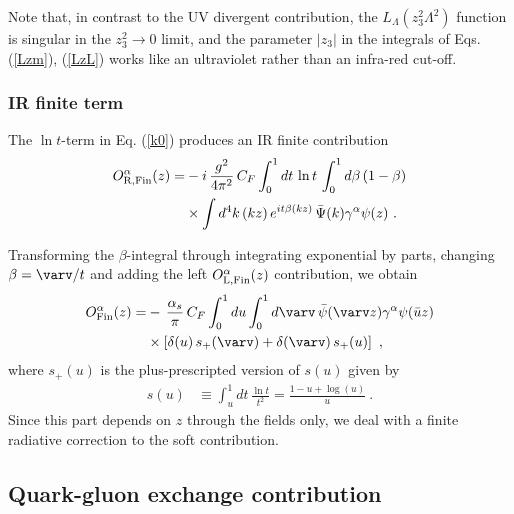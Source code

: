 \documentclass[final,5p,times,twocolumn]{elsarticle}
\begin{document}
Note  that, in contrast to  the UV divergent contribution,
the  $L_ \Lambda(z_3^2  \Lambda^2)$ function is singular in the $z_3^2\to 0$ limit, and 
the parameter 
 $|z_3|$  in the integrals  of Eqs. (\ref{Lzm}), (\ref{LzL})  works like an  ultraviolet 
 rather than an  infra-red cut-off. 
 


 \subsubsection{IR finite  term}


The  $\ln t$-term in Eq. (\ref{k0})  produces an IR finite contribution 
     \begin{align} 
  O^\alpha_{\rm R, Fin}  (z)  =&-  i    \,      \frac{ g^2}{4 \pi^2} \, C_F  \int_0^1 dt \, \ln  t \, 
    \int_0^1 d \beta \, (1-\beta)       \nonumber \\ &  \times    \int d^4 k \,    (kz)\, 
     e^{i  t \beta  (k z)} 
     \,    \bar \Psi (k)    \gamma^\alpha \psi (z)
   \ .
    \label{Lnt}
 \end{align} 
 




 

Transforming the $\beta$-integral through integrating exponential   by parts,  
changing  $\beta=\varv/t$  and adding the  left $O^\alpha_{\rm L, Fin}  (z)$ contribution, we obtain 
   \begin{align} 
  O^\alpha_{\rm  Fin}  (z)  =&-     \,      \frac{ \alpha_s }{ \pi} \, C_F  \int_0^1 du \int_0^1 d\varv \, 
\bar \psi (\varv z)    \gamma^\alpha \psi (\bar u z) 
       \nonumber \\ &  \times 
   \left [  \delta (u) \,  s_+(\varv)+ \delta (\varv) \,  s_+(u) \right ]
   \ , 
    \label{Ftot}
 \end{align} 
 where $s_+(u)$ is the plus-prescripted version of $s(u)$ given by 
    \begin{align} 
s(u) & \equiv 
  \int_u^1 dt \,\frac{ \ln t}{t^2}  = \frac{1-u+\log (u)}{u}  \   . 
    \label{Sv}
 \end{align}
Since this part   depends on $z$   through the  fields only,  we deal  with  a finite radiative correction
to the soft contribution. 

\subsection{Quark-gluon exchange contribution}
\end{document}

